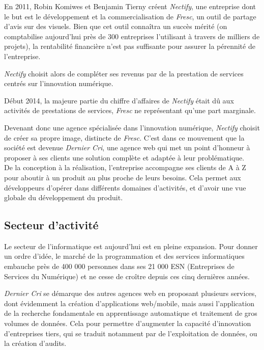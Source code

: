 \documentclass[12pt,a4paper]{article}
\begin{document}
  \bigskip

  En 2011, Robin Komiwes et Benjamin Tierny créent \emph{Nectify}, une
  entreprise dont le but est le développement et la commercialisation de
  \emph{Fresc}, un outil de partage d'avis sur des visuels. Bien que cet
  outil connaîtra un succès mérité (on comptabilise aujourd'hui près de
  300 entreprises l'utilisant à travers de milliers de projets), la
  rentabilité financière n'est pas suffisante pour assurer la pérennité de
  l'entreprise.

  \bigskip

  \emph{Nectify} choisit alors de compléter ses revenus par de la
  prestation de services centrés sur l'innovation numérique.

  \bigskip

  Début 2014, la majeure partie du chiffre d'affaires de \emph{Nectify}
  était dû aux activités de prestations de services, \emph{Fresc} ne
  représentant qu'une part marginale.

  \bigskip

  Devenant donc une agence spécialisée dans l'innovation numérique,
  \emph{Nectify} choisit de créer sa propre image, distincte de
  \emph{Fresc}. C'est dans ce mouvement que la société est devenue
  \emph{Dernier Cri}, une agence web qui met un point d'honneur à proposer
  à ses clients une solution complète et adaptée à leur problématique.\\
  De la conception à la réalisation, l'entreprise accompagne ses clients
  de A à Z pour aboutir à un produit au plus proche de leurs besoins. Cela
  permet aux développeurs d'opérer dans différents domaines d'activités,
  et d'avoir une vue globale du développement du produit.

  \bigskip

  \subsection{Secteur d'activité}\label{secteur-dactivituxe9}

  \bigskip

  Le secteur de l'informatique est aujourd'hui est en pleine expansion.
  Pour donner un ordre d'idée, le marché de la programmation et des
  services informatiques embauche près de 400 000 personnes dans ses 21
  000 ESN (Entreprises de Services du Numérique) et ne cesse de croître
  depuis ces cinq dernières années.

  \bigskip

  \emph{Dernier Cri} se démarque des autres agences web en proposant
  plusieurs services, dont évidemment la création d'applications
  web/mobile, mais aussi l'application de la recherche fondamentale en
  apprentissage automatique et traitement de gros volumes de données. Cela
  pour permettre d'augmenter la capacité d'innovation d'entreprises tiers,
  qui se traduit notamment par de l'exploitation de données, ou la
  création d'audits.
\end{document}
